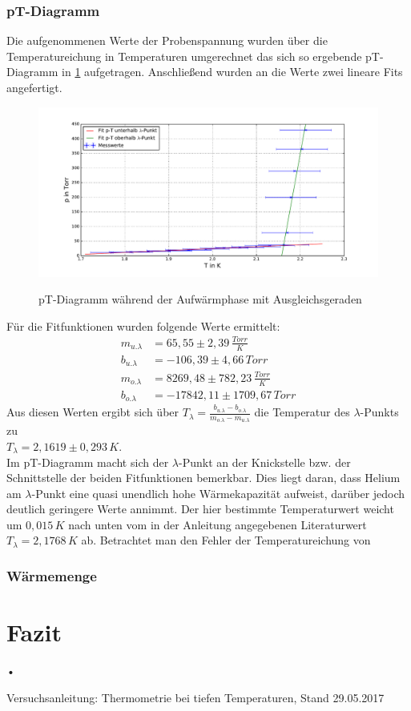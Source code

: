 \documentclass[twoside,colorback,accentcolor=tud4c,11pt]{tudreport}
\begin{document}
\subsection{pT-Diagramm}
Die aufgenommenen Werte der Probenspannung wurden über die Temperatureichung in Temperaturen umgerechnet das sich so ergebende pT-Diagramm in \ref{pTdia} aufgetragen. Anschließend wurden an die Werte zwei lineare Fits angefertigt.
\begin{figure}[H]
\centering
   	\begin{minipage}[b]{1.0\textwidth}
   	\includegraphics[width=\textwidth]{graphics/pT.pdf}
  	\label{pTdia}
   	\end{minipage}
\caption{pT-Diagramm während der Aufwärmphase mit Ausgleichsgeraden}	
\end{figure}
Für die Fitfunktionen wurden folgende Werte ermittelt:
\begin{align}
m_{u.\lambda}&=65,55\pm 2,39 \,\si{\frac{Torr}{K}}\\
b_{u.\lambda}&=-106,39\pm 4,66\,\si{Torr}\\
m_{o.\lambda}&=8269,48\pm 782,23 \,\si{\frac{Torr}{K}}\\
b_{o.\lambda}&=-17842,11\pm 1709,67\,\si{Torr}
\end{align}
Aus diesen Werten ergibt sich über $T_{\lambda}=\frac{b_{u.\lambda}-b_{o.\lambda}}{m_{o.\lambda}-m_{u.\lambda}}$ die Temperatur des $\lambda$-Punkts zu\\ $T_{\lambda}=2,1619\pm 0,293\,\si{K}$.\\
Im pT-Diagramm macht sich der $\lambda$-Punkt an der Knickstelle bzw. der Schnittstelle der beiden Fitfunktionen bemerkbar. Dies liegt daran, dass Helium am $\lambda$-Punkt eine quasi unendlich hohe Wärmekapazität aufweist, darüber jedoch deutlich geringere Werte annimmt. Der hier bestimmte Temperaturwert  weicht um $0,015\,\si{K}$ nach unten vom in der Anleitung angegebenen Literaturwert $T_{\lambda}=2,1768\,\si{K}$ ab. Betrachtet man den Fehler der Temperatureichung von 
\subsection{Wärmemenge}
\chapter{Fazit}	
•
\renewcommand{\bibname}{Literatur}
\begin{thebibliography}{0}
 Versuchsanleitung: Thermometrie bei tiefen Temperaturen, Stand 29.05.2017

\end{thebibliography}
\end{document}

